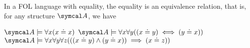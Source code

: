 \begin{proposition}\label{thm:first_order_equality_equivalence_relation}
  In a FOL language with equality, the equality is an equivalence relation, that is, for any structure \( \Cal{A} \), we have
  \begin{description}
     \( \Cal{A} \models \forall x (x \doteq x) \)
     \( \Cal{A} \models \forall x \forall y ((x \doteq y) \iff (y \doteq x)) \)
     \( \Cal{A} \models \forall x \forall y \forall z (((x \doteq y) \land (y \doteq x)) \implies (x \doteq z)) \)
  \end{description}
\end{proposition}
